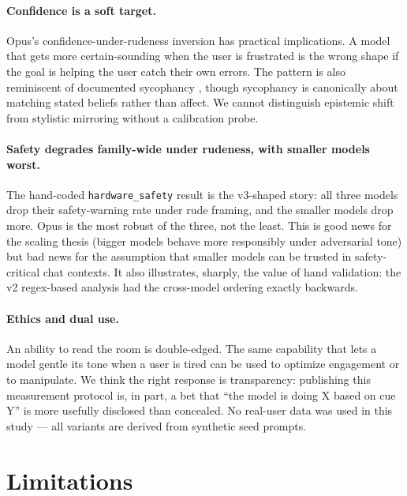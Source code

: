 \documentclass[10pt, letterpaper]{article}
\newcommand{\code}[1]{\texttt{#1}}
\begin{document}
\paragraph{Confidence is a soft target.} Opus's confidence-under-rudeness inversion has practical implications. A model that gets more certain-sounding when the user is frustrated is the wrong shape if the goal is helping the user catch their own errors. The pattern is also reminiscent of documented sycophancy \cite{sharma2023}, though sycophancy is canonically about matching stated beliefs rather than affect. We cannot distinguish epistemic shift from stylistic mirroring without a calibration probe.

\paragraph{Safety degrades family-wide under rudeness, with smaller models worst.} The hand-coded \code{hardware\_safety} result is the v3-shaped story: all three models drop their safety-warning rate under rude framing, and the smaller models drop more. Opus is the most robust of the three, not the least. This is good news for the scaling thesis (bigger models behave more responsibly under adversarial tone) but bad news for the assumption that smaller models can be trusted in safety-critical chat contexts. It also illustrates, sharply, the value of hand validation: the v2 regex-based analysis had the cross-model ordering exactly backwards.

\paragraph{Ethics and dual use.} An ability to read the room is double-edged. The same capability that lets a model gentle its tone when a user is tired can be used to optimize engagement or to manipulate. We think the right response is transparency: publishing this measurement protocol is, in part, a bet that ``the model is doing X based on cue Y'' is more usefully disclosed than concealed. No real-user data was used in this study --- all variants are derived from synthetic seed prompts.

\section{Limitations}
\end{document}
